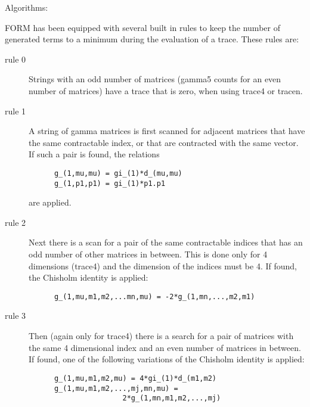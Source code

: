 \vspace{3mm}

\noindent Algorithms:

FORM has been equipped with several built in rules to keep the 
number of generated terms to a minimum during the evaluation of a 
trace. These rules are:

\begin{description}
\item [rule 0]
    Strings with an odd number of matrices (gamma5 counts for an even number 
    of matrices) have a trace that is zero, when using trace4 or tracen.
\item [rule 1]
    A string of gamma matrices is first scanned for adjacent 
matrices that have the same contractable index, or that are contracted with 
the same vector. If such a pair is found, the relations
\begin{verbatim}
      g_(1,mu,mu) = gi_(1)*d_(mu,mu)
      g_(1,p1,p1) = gi_(1)*p1.p1
\end{verbatim}
\noindent are applied.
\item [rule 2]
   Next there is a scan for a pair of the same contractable 
indices that has an odd number of other matrices in between. This is done 
only for 4 dimensions (trace4) and the dimension of the indices must be 4. 
If found, the Chisholm identity is applied:
\begin{verbatim}
      g_(1,mu,m1,m2,...mn,mu) = -2*g_(1,mn,...,m2,m1)
\end{verbatim}
\item [rule 3]
  Then (again only for trace4) there is a search for a pair 
of matrices with the same 4 dimensional index and an even number of 
matrices in between. If found, one of the following variations of the 
Chisholm identity is applied:
\begin{verbatim}
      g_(1,mu,m1,m2,mu) = 4*gi_(1)*d_(m1,m2)
      g_(1,mu,m1,m2,...,mj,mn,mu) =
                      2*g_(1,mn,m1,m2,...,mj)

\end{verbatim}
\end{description}
